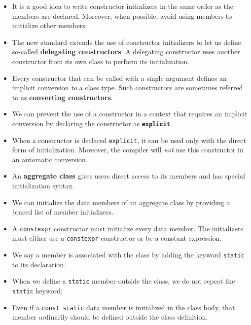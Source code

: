 \begin{itemize}
\item
It is a good idea to write constructor initializers in the same order as the members are declared. Moreover, when possible, avoid using members to initialize other members.

\item
The new standard extends the use of constructor initializers to let us define so-called \textbf{delegating constructors}. A delegating constructor uses another constructor from its own class to perform its initialization.

\item
Every constructor that can be called with a single argument defines an implicit conversion \textit{to} a class type. Such constructors are sometimes referred to as \textbf{converting constructors}.

\item
We can prevent the use of a constructor in a context that requires an implicit conversion by declaring the constructor as \textbf{\texttt{explicit}}.

\item
When a constructor is declared \texttt{explicit}, it can be used only with the direct form of initialization. Moreover, the compiler will \textit{not} use this constructor in an automatic conversion.

\item
An \textbf{aggregate class} gives users direct access to its members and has special initialization syntax.

\item
We can initialize the data members of an aggregate class by providing a braced list of member initializers.

\item
A \texttt{constexpr} constructor must initialize every data member. The initializers must either use a \texttt{constexpr} constructor or be a constant expression.

\item
We say a member is associated with the class by adding the keyword \texttt{static} to its declaration.

\item
When we define a \texttt{static} member outside the class, we do not repeat the \texttt{static} keyword;

\item
Even if a \texttt{const static} data member is initialized in the class body, that member ordinarily should be defined outside the class definition.

\end{itemize}